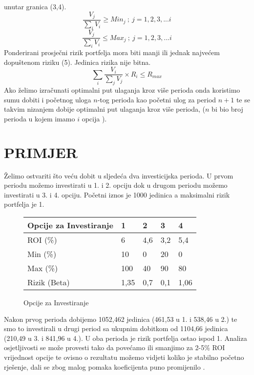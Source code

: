 \documentclass[9pt]{extarticle}
\newcommand{\prored}{\vspace{12pt}} \newcommand{\indentacija}{\hspace{3,5mm}}
\begin{document}
\begin{multicols*}{2}
unutar granica (3,4). \begin{equation} \frac{V_j}{\sum_i V_i} \geq Min_j \ ; \ j = 1,2,3,...i \end{equation} 
\begin{equation} \frac{V_j}{\sum_i V_i} \leq Max_j \ ; \ j = 1,2,3,...i \end{equation} \prored \noindent 
Ponderirani prosječni rizik portfelja \cite{measureportfolioRisk} mora biti manji ili jednak najvećem dopuštenom 
riziku (5). Jedinica rizika nije bitna. \begin{equation} \sum_i \frac{V_i}{\sum_j V_j} \times R_i \leq R_{max} 
\end{equation} Ako želimo izračunati optimalni put ulaganja kroz više perioda onda koristimo sumu dobiti i 
početnog uloga \(n\)-tog perioda kao početni ulog za period \(n+1\) te se takvim nizanjem dobije optimalni put 
ulaganja kroz više perioda, (\(n\) bi bio broj perioda u kojem imamo \(i\) opcija ). \section{\centering 
PRIMJER} \indentacija Želimo ostvariti što veću dobit u sljedeća dva investicijska perioda. U prvom periodu 
možemo investirati u 1. i 2. opciju dok u drugom periodu možemo investirati u 3. i 4. opciju. Početni iznos je 
1000 jedinica a maksimalni rizik portfelja je 1. \begin{figure}[H] \centering \begin{tabular}{@{}|l|l|l|l|l|@{}} 
\toprule Opcije za Investiranje & 1 & 2 & 3 & 4 \\ \midrule ROI (\%) & 6 & 4,6 & 3,2 & 5,4 \\ \midrule Min (\%) 
& 10 & 0 & 20 & 0 \\ \midrule Max (\%) & 100 & 40 & 90 & 80 \\ \midrule Rizik (Beta) & 1,35 & 0,7 & 0,1 & 1,06 
\\ \bottomrule \end{tabular} \caption{Opcije za Investiranje} \end{figure} Nakon prvog perioda dobijemo 1052,462 
jedinica (461,53 u 1. i 538,46 u 2.) te smo to investirali u drugi period sa ukupnim dobitkom od 1104,66 
jedinica (210,49 u 3. i 841,96 u 4.). U oba perioda je rizik portfelja ostao ispod 1. Analiza osjetljivosti se 
može provesti tako da povećamo ili smanjimo za 2-5\% ROI vrijednost opcije te ovisno o rezultatu možemo vidjeti 
koliko je stabilno početno rješenje, dali se zbog malog pomaka koeficijenta puno promijenilo 
\cite{LinearProgrammingandApplication:}.

\end{multicols*}
\end{document}

